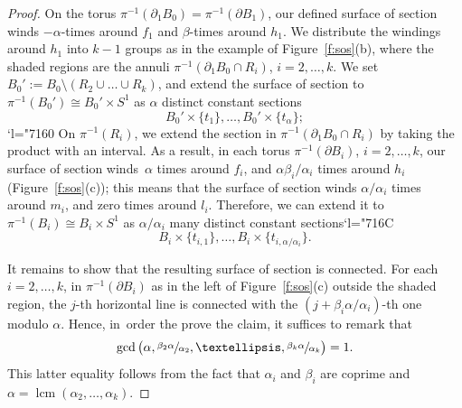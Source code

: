 \documentclass[10pt,a4paper]{amsart}
\newcommand{\Changel}{\mathcode`l="7160}
\newcommand{\Changelback}{\mathcode`l="716C}
\theoremstyle{definition}
\DeclareMathOperator{\lcm}{lcm}
\begin{document}
\begin{proof}
On the torus $\pi^{-1}(\partial_1 B_0)=\pi^{-1}(\partial B_1)$, our defined surface of section winds $- \alpha$\nobreakdash-times around $f_1$ and $ \beta$-times around $h_1$. We distribute the windings around $h_1$ into $k-1$ groups as in the example of Figure~\ref{f:sos}(b), where the shaded regions are the annuli $\pi^{-1}(\partial_1 B_0 \cap R_i)$, $i=2,\dots,k$. We set $B_0':=B_0\setminus (R_2\cup\dots\cup R_k)$, and extend the surface of section to $\pi^{-1}(B_0')\cong B_0'\times S^1$ as $\alpha$ distinct constant sections
\[
B_0'\times\{t_1\},\dots, B_0'\times\{t_{\alpha}\};
\]
\Changel
On $\pi^{-1}(R_i)$, we extend the section in $\pi^{-1}(\partial_1 B_0 \cap R_i)$ by taking the product with an interval. As a result, in each torus $\pi^{-1}(\partial B_i)$, $i=2,\dots,k$, our surface of section winds~$\alpha$ times around $f_i$, and $\alpha\beta_i/\alpha_i$ times around $h_i$ (Figure~\ref{f:sos}(c)); this means that the surface of section winds $\alpha/\alpha_i$ times around $m_i$, and zero times around $l_i$. Therefore, we can extend it to $\pi^{-1}(B_i)\cong B_i\times S^1$ as $\alpha/\alpha_i$ many distinct constant sections\Changelback
\[
B_i\times\{t_{i,1}\},\dots,B_i\times\{t_{i,\alpha/\alpha_i}\}.
\]

It remains to show that the resulting surface of section is connected. For each $i=2,\dots,k$, in $\pi^{-1}(\partial B_i)$ as in the left of Figure~\ref{f:sos}(c) outside the shaded region, the $j$-th horizontal line is connected with the $(j+ \beta_i\alpha/\alpha_i)$-th one modulo $\alpha$. Hence, in~order the prove the claim, it suffices to remark that
\[
\gcd\big( \alpha, \sfrac{\beta_2 \alpha}{\alpha_2},\dots, \sfrac{\beta_k \alpha}{\alpha_k}\big) = 1.
\]
This latter equality follows from the fact that $\alpha_i$ and $\beta_i$ are coprime and $ \alpha=\lcm(\alpha_2,\dots,\alpha_k)$.
\end{proof}
\end{document}

